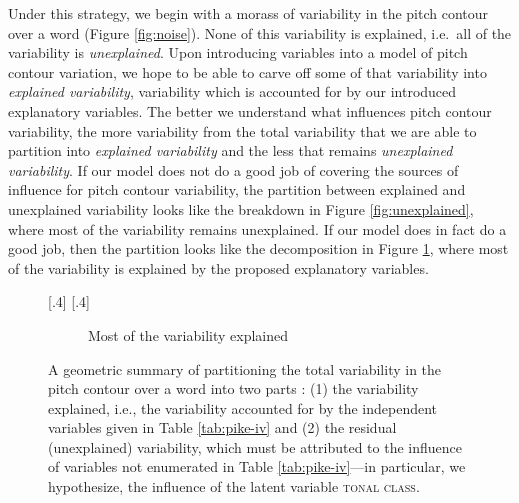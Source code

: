 \documentclass[12pt]{article}
\begin{document}
Under this strategy, we begin with a morass of variability in the
pitch contour over a word (Figure \ref{fig:noise}). None of this
  variability is explained, i.e.\ all of the variability is
  \textit{unexplained}. Upon introducing variables into a model of
  pitch contour variation, we hope to be able to carve off some of
  that variability into \textit{explained variability}, variability
  which is accounted for by our introduced explanatory variables. The
  better we understand what influences pitch contour variability, the
  more variability from the total variability that we are able to partition
  into \textit{explained variability} and the less that remains
  \textit{unexplained variability}. If our model does not do a good job of
  covering the sources of influence for pitch contour variability, the
  partition between explained and unexplained variability looks
  like the breakdown in Figure \ref{fig:unexplained}, where most of the
  variability remains unexplained. If our model does
  in fact do a good job, then the partition looks like the decomposition
  in Figure \ref{fig:explained}, where most of the variability is
  explained by the proposed explanatory variables.  

\begin{figure}
  \centering
{}
[.4\linewidth]{}%
\qquad\qquad
{}
[.4\linewidth]{}%

\hfill\break

\begin{subfigure}[t]{0.5\textwidth}
  \centering
  \caption{Most of the variability explained}
  \label{fig:explained}
\end{subfigure}
  \caption{A geometric 
summary of partitioning the total variability in the pitch
  contour over a word into two parts \citep{Saville:1986}: (1) the variability explained,
  i.e., the variability accounted for by the independent variables given
  in Table \ref{tab:pike-iv}  and
  (2) the residual (unexplained) variability, which must be attributed to the influence
  of variables not enumerated in Table \ref{tab:pike-iv}---in
  particular, we hypothesize, the influence of the latent variable \textsc{tonal class}.}
  \label{fig:triangle-tikz}
\end{figure}
\end{document}
